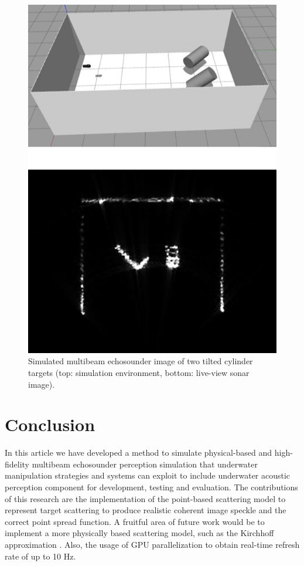 \documentclass[utf8]{frontiersSCNS} %
\begin{document}
\begin{figure}[t]
  \centering
  \includegraphics[width=\columnwidth]{images/two_cylinder_angled.png}
  \caption{Simulated multibeam echosounder image of two tilted cylinder targets (top: simulation environment, bottom: live-view sonar image).}
  \label{f:two_cylinder_angled}
\end{figure} 

\section{Conclusion}
In this article we have developed a method to simulate physical-based and high-fidelity multibeam echosounder perception simulation that underwater manipulation strategies and systems can exploit to include underwater acoustic perception component for development, testing and evaluation. The contributions of this research are the implementation of the point-based scattering model to represent target scattering to produce realistic coherent image speckle and the correct point spread function. A fruitful area of future work would be to implement a more physically based scattering model, such as the Kirchhoff approximation \citep{Abawi2016_TriKirchh}. Also, the usage of GPU parallelization to obtain real-time refresh rate of up to 10 Hz.
\end{document}

